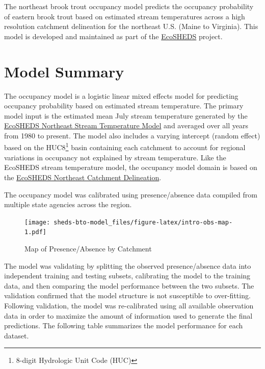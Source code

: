 \documentclass[
]{book}
\begin{document}
The northeast brook trout occupancy model predicts the occupancy probability of eastern brook trout based on estimated stream temperatures across a high resolution catchment delineation for the northeast U.S. (Maine to Virginia). This model is developed and maintained as part of the \href{https://www.usgs.gov/apps/ecosheds/}{EcoSHEDS} project.

\hypertarget{model-summary}{%
\section{Model Summary}\label{model-summary}}

The occupancy model is a logistic linear mixed effects model for predicting occupancy probability based on estimated stream temperature. The primary model input is the estimated mean July stream temperature generated by the \href{https://ecosheds.org/models/stream-temperature/latest/}{EcoSHEDS Northeast Stream Temperature Model} and averaged over all years from 1980 to present. The model also includes a varying intercept (random effect) based on the HUC8\footnote{8-digit Hydrologic Unit Code (HUC)} basin containing each catchment to account for regional variations in occupancy not explained by stream temperature. Like the EcoSHEDS stream temperature model, the occupancy model domain is based on the \href{https://conte-ecology.github.io/shedsGisData/\#the-national-hydrography-dataset-high-resolution-delineation-version-2-nhdhrdv2}{EcoSHEDS Northeast Catchment Delineation}.

The occupancy model was calibrated using presence/absence data compiled from multiple state agencies across the region.

\begin{figure}
\centering
\texttt{[image: sheds-bto-model\_files/figure-latex/intro-obs-map-1.pdf]}
\caption{\label{fig:intro-obs-map}Map of Presence/Absence by Catchment}
\end{figure}

The model was validating by splitting the observed presence/absence data into independent training and testing subsets, calibrating the model to the training data, and then comparing the model performance between the two subsets. The validation confirmed that the model structure is not susceptible to over-fitting. Following validation, the model was re-calibrated using all available observation data in order to maximize the amount of information used to generate the final predictions. The following table summarizes the model performance for each dataset.
\end{document}
